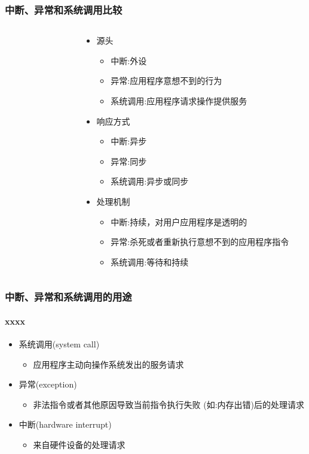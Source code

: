 \begin{frame}
	\frametitle{中断、异常和系统调用比较}
    \begin{columns}
    \begin{column}{0.4\textwidth}
        \begin{figure}
        \end{figure}
    \end{column}
    \begin{column}{0.6\textwidth}
    \begin{itemize}
        \item 源头
	    \begin{itemize}
	       \item 中断:外设
	       \item 异常:应用程序意想不到的行为
	       \item 系统调用:应用程序请求操作提供服务
    	\end{itemize}
        \item 响应方式
	    \begin{itemize}
        	\item 中断:异步
        	\item 异常:同步
        	\item 系统调用:异步或同步
    	\end{itemize}
        \item 处理机制
	    \begin{itemize}
        	\item 中断:持续，对用户应用程序是透明的
        	\item 异常:杀死或者重新执行意想不到的应用程序指令
        	\item 系统调用:等待和持续
    	\end{itemize}
    \end{itemize}
    \end{column}
    \end{columns}
\end{frame}
\begin{frame}
	\frametitle{中断、异常和系统调用的用途}
	\framesubtitle{xxxx}
    \begin{itemize}
        \item 系统调用(system call)
	    \begin{itemize}
        	\item 应用程序主动向操作系统发出的服务请求
    	\end{itemize}
        \item 异常(exception)
	    \begin{itemize}
        	\item 非法指令或者其他原因导致当前指令执行失败 (如:内存出错)后的处理请求
    	\end{itemize}
        \item 中断(hardware interrupt)
	    \begin{itemize}
        	\item 来自硬件设备的处理请求
    	\end{itemize}
    \end{itemize}
\end{frame}
